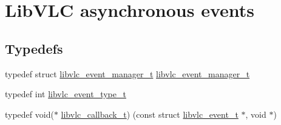 \hypertarget{group__libvlc__event}{}\section{Lib\+V\+LC asynchronous events}
\label{group__libvlc__event}
\subsection*{Typedefs}
\begin{DoxyCompactItemize}
\item 
typedef struct \hyperlink{group__libvlc__event_gaa82f247503d3558b9117550e8d3c9259}{libvlc\+\_\+event\+\_\+manager\+\_\+t} \hyperlink{group__libvlc__event_gaa82f247503d3558b9117550e8d3c9259}{libvlc\+\_\+event\+\_\+manager\+\_\+t}
\item 
typedef int \hyperlink{group__libvlc__event_ga88990ac48895aa07caece9eb75c2f2da}{libvlc\+\_\+event\+\_\+type\+\_\+t}
\item 
typedef void($\ast$ \hyperlink{group__libvlc__event_gafb4d63849005e4dce5b2180a40144fe4}{libvlc\+\_\+callback\+\_\+t}) (const struct \hyperlink{structlibvlc__event__t}{libvlc\+\_\+event\+\_\+t} $\ast$, void $\ast$)
\end{DoxyCompactItemize}
